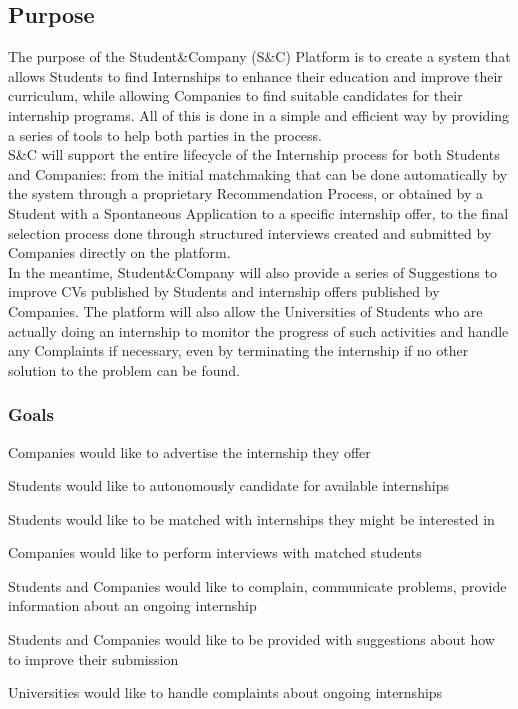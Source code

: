 \subsection{Purpose}
The purpose of the Student\&Company (S\&C) Platform is to create a system that allows Students to find Internships to enhance their education and improve their curriculum, while allowing Companies to find suitable candidates for their internship programs. All of this is done in a simple and efficient way by providing a series of tools to help both parties in the process.\\
S\&C will support the entire lifecycle of the Internship process for both Students and Companies: from the initial matchmaking that can be done automatically by the system through a proprietary Recommendation Process, or obtained by a Student with a Spontaneous Application to a specific internship offer, to the final selection process done through structured interviews created and submitted by Companies directly on the platform.\\%
In the meantime, Student\&Company will also provide a series of Suggestions to improve CVs published by Students and internship offers published by Companies. The platform will also allow the Universities of Students who are actually doing an internship to monitor the progress of such activities and handle any Complaints if necessary, even by terminating the internship if no other solution to the problem can be found.
\subsubsection{Goals}
\begin{enumerate}[label={\color{titleColor}[G\arabic*]}]
\item Companies would like to advertise the internship they offer 
\item Students would like to autonomously candidate for available internships 
 \item Students would like to be matched with internships they might be interested in 
 \item Companies would like to perform interviews with matched students 
 \item Students and Companies would like to complain, communicate problems, provide information about an ongoing internship 
 \item Students and Companies would like to be provided with suggestions about how to improve their submission 
 \item Universities would like to handle complaints about ongoing internships 
\end{enumerate}


